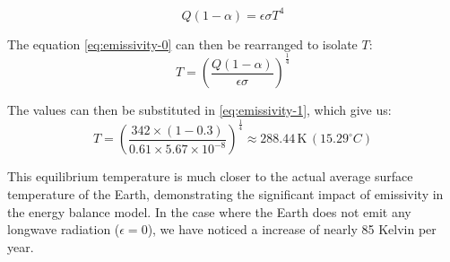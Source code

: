 \documentclass[12pt]{article}
\begin{document}
\begin{equation} \label{eq:emissivity-0}
    Q(1 - \alpha) = \epsilon\sigma T^4
\end{equation}

\noindent The equation \ref{eq:emissivity-0} can then be rearranged to isolate $T$:
\begin{equation} \label{eq:emissivity-1}
    T = \left( \frac{Q(1 - \alpha)}{\epsilon\sigma} \right)^{\frac{1}{4}}
\end{equation}

\noindent The values can then be substituted in \ref{eq:emissivity-1}, which give us:
\begin{equation}
    T = \left( \frac{342 \times (1 - 0.3)}{0.61 \times 5.67 \times 10^{-8}} \right)^{\frac{1}{4}} \approx 288.44 \, \text{K} \, ({15.29}^\circ C)
\end{equation}


This equilibrium temperature is much closer to the actual average surface temperature of the Earth, demonstrating the significant impact of emissivity
in the energy balance model. In the case where the Earth does not emit any longwave radiation ($\epsilon=0$), we have noticed a increase of nearly 85 Kelvin per year.
\end{document}
